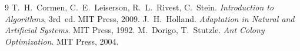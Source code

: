 \documentclass[12pt, a4paper]{article}
\theoremstyle{definition}
\begin{document}
\begin{thebibliography}{9}
        T.~H.~Cormen, C.~E.~Leiserson, R.~L.~Rivest, C.~Stein.
        \textit{Introduction to Algorithms}, 3rd~ed.
        MIT Press, 2009.
        J.~H.~Holland.
        \textit{Adaptation in Natural and Artificial Systems}.
        MIT Press, 1992.
        M.~Dorigo, T.~Stutzle.
        \textit{Ant Colony Optimization}.
        MIT Press, 2004.
\end{thebibliography}
\end{document}
